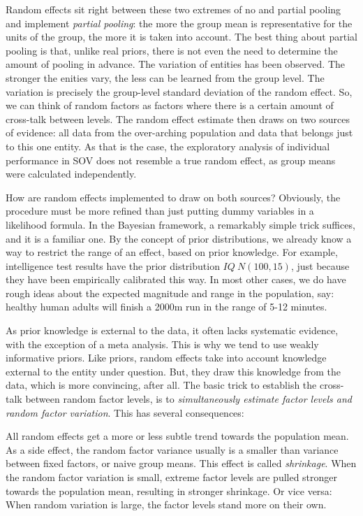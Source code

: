 \documentclass[]{svmono}
\theoremstyle{definition}
\theoremstyle{definition}
\theoremstyle{definition}
\theoremstyle{remark}
\begin{document}
Random effects sit right between these two extremes of no and partial
pooling and implement \emph{partial pooling}: the more the group mean is
representative for the units of the group, the more it is taken into
account. The best thing about partial pooling is that, unlike real
priors, there is not even the need to determine the amount of pooling in
advance. The variation of entities has been observed. The stronger the
enities vary, the less can be learned from the group level. The
variation is precisely the group-level standard deviation of the random
effect. So, we can think of random factors as factors where there is a
certain amount of cross-talk between levels. The random effect estimate
then draws on two sources of evidence: all data from the over-arching
population and data that belongs just to this one entity. As that is the
case, the exploratory analysis of individual performance in SOV does not
resemble a true random effect, as group means were calculated
independently.

How are random effects implemented to draw on both sources? Obviously,
the procedure must be more refined than just putting dummy variables in
a likelihood formula. In the Bayesian framework, a remarkably simple
trick suffices, and it is a familiar one. By the concept of prior
distributions, we already know a way to restrict the range of an effect,
based on prior knowledge. For example, intelligence test results have
the prior distribution \(IQ ~ N(100, 15)\), just because they have been
empirically calibrated this way. In most other cases, we do have rough
ideas about the expected magnitude and range in the population, say:
healthy human adults will finish a 2000m run in the range of 5-12
minutes.

As prior knowledge is external to the data, it often lacks systematic
evidence, with the exception of a meta analysis. This is why we tend to
use weakly informative priors. Like priors, random effects take into
account knowledge external to the entity under question. But, they draw
this knowledge from the data, which is more convincing, after all. The
basic trick to establish the cross-talk between random factor levels, is
to \emph{simultaneously estimate factor levels and random factor
variation}. This has several consequences:

All random effects get a more or less subtle trend towards the
population mean. As a side effect, the random factor variance usually is
a smaller than variance between fixed factors, or naive group means.
This effect is called \emph{shrinkage}. When the random factor variation
is small, extreme factor levels are pulled stronger towards the
population mean, resulting in stronger shrinkage. Or vice versa: When
random variation is large, the factor levels stand more on their own.
\end{document}
